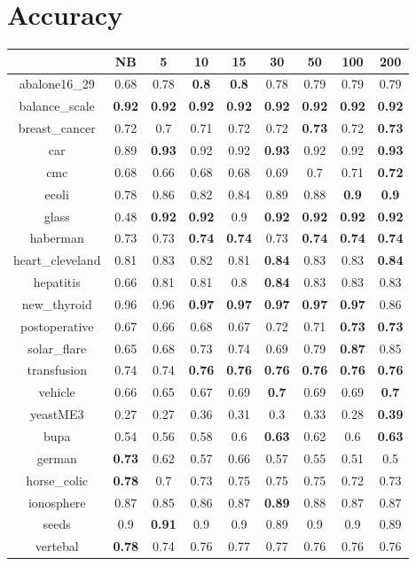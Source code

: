 \documentclass{article}%
\begin{document}
%
\normalsize%
\section*{Accuracy}%
\begin{tabular}{c|cccccccc}%
\hline%
&NB&5&10&15&30&50&100&200\\%
\hline%
abalone16\_29&0.68&0.78&\textbf{0.8}&\textbf{0.8}&0.78&0.79&0.79&0.79\\%
\hline%
balance\_scale&\textbf{0.92}&\textbf{0.92}&\textbf{0.92}&\textbf{0.92}&\textbf{0.92}&\textbf{0.92}&\textbf{0.92}&\textbf{0.92}\\%
\hline%
breast\_cancer&0.72&0.7&0.71&0.72&0.72&\textbf{0.73}&0.72&\textbf{0.73}\\%
\hline%
car&0.89&\textbf{0.93}&0.92&0.92&\textbf{0.93}&0.92&0.92&\textbf{0.93}\\%
\hline%
cmc&0.68&0.66&0.68&0.68&0.69&0.7&0.71&\textbf{0.72}\\%
\hline%
ecoli&0.78&0.86&0.82&0.84&0.89&0.88&\textbf{0.9}&\textbf{0.9}\\%
\hline%
glass&0.48&\textbf{0.92}&\textbf{0.92}&0.9&\textbf{0.92}&\textbf{0.92}&\textbf{0.92}&\textbf{0.92}\\%
\hline%
haberman&0.73&0.73&\textbf{0.74}&\textbf{0.74}&0.73&\textbf{0.74}&\textbf{0.74}&\textbf{0.74}\\%
\hline%
heart\_cleveland&0.81&0.83&0.82&0.81&\textbf{0.84}&0.83&0.83&\textbf{0.84}\\%
\hline%
hepatitis&0.66&0.81&0.81&0.8&\textbf{0.84}&0.83&0.83&0.83\\%
\hline%
new\_thyroid&0.96&0.96&\textbf{0.97}&\textbf{0.97}&\textbf{0.97}&\textbf{0.97}&\textbf{0.97}&0.86\\%
\hline%
postoperative&0.67&0.66&0.68&0.67&0.72&0.71&\textbf{0.73}&\textbf{0.73}\\%
\hline%
solar\_flare&0.65&0.68&0.73&0.74&0.69&0.79&\textbf{0.87}&0.85\\%
\hline%
transfusion&0.74&0.74&\textbf{0.76}&\textbf{0.76}&\textbf{0.76}&\textbf{0.76}&\textbf{0.76}&\textbf{0.76}\\%
\hline%
vehicle&0.66&0.65&0.67&0.69&\textbf{0.7}&0.69&0.69&\textbf{0.7}\\%
\hline%
yeastME3&0.27&0.27&0.36&0.31&0.3&0.33&0.28&\textbf{0.39}\\%
\hline%
bupa&0.54&0.56&0.58&0.6&\textbf{0.63}&0.62&0.6&\textbf{0.63}\\%
\hline%
german&\textbf{0.73}&0.62&0.57&0.66&0.57&0.55&0.51&0.5\\%
\hline%
horse\_colic&\textbf{0.78}&0.7&0.73&0.75&0.75&0.75&0.72&0.73\\%
\hline%
ionosphere&0.87&0.85&0.86&0.87&\textbf{0.89}&0.88&0.87&0.87\\%
\hline%
seeds&0.9&\textbf{0.91}&0.9&0.9&0.89&0.9&0.9&0.89\\%
\hline%
vertebal&\textbf{0.78}&0.74&0.76&0.77&0.77&0.76&0.76&0.76\\%
\hline%
\end{tabular}
\end{document}

